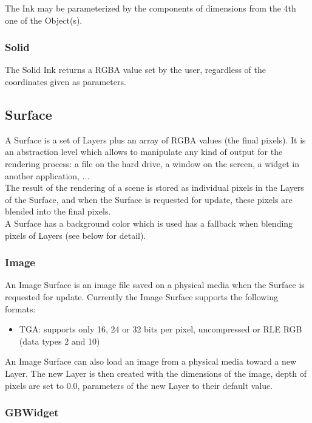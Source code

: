 The Ink may be parameterized by the components of dimensions from the 4th one of the Object(s).\\

\subsubsection{Solid}

The Solid Ink returns a RGBA value set by the user, regardless of the coordinates given as parameters.

\subsection{Surface}

A Surface is a set of Layers plus an array of RGBA values (the final pixels). It is an abstraction level which allows to manipulate any kind of output for the rendering process: a file on the hard drive, a window on the screen, a widget in another application, ...\\

The result of the rendering of a scene is stored as individual pixels in the Layers of the Surface, and when the Surface is requested for update, these pixels are blended into the final pixels.\\

A Surface has a background color which is used has a fallback when blending pixels of Layers (see below for detail).

\subsubsection{Image}

An Image Surface is an image file saved on a physical media when the Surface is requested for update. Currently the Image Surface supports the following formats:\\
\begin{itemize}
\item TGA: supports only 16, 24 or 32 bits per pixel, uncompressed or RLE RGB (data types 2 and 10)
\end{itemize}

An Image Surface can also load an image from a physical media toward a new Layer. The new Layer is then created with the dimensions of the image, depth of pixels are set to 0.0, parameters of the new Layer to their default value.\\

\subsubsection{GBWidget}


